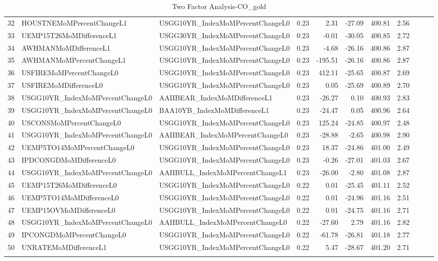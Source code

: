 \begin{longtable}{rllrrrrrlll}
  32 & HOUSTNEMoMPercentChangeL1 & USGG10YR\_IndexMoMPercentChangeL0 & 0.23 & 2.31 & -27.09 & 400.81 & 2.56 &  &  &  \\ 
  33 & UEMP15T26MoMDifferenceL1 & USGG30YR\_IndexMoMPercentChangeL0 & 0.23 & -0.01 & -30.05 & 400.85 & 2.72 &  &  &  \\ 
  34 & AWHMANMoMDifferenceL1 & USGG10YR\_IndexMoMPercentChangeL0 & 0.23 & -4.68 & -26.16 & 400.86 & 2.87 &  &  &  \\ 
  35 & AWHMANMoMPercentChangeL1 & USGG10YR\_IndexMoMPercentChangeL0 & 0.23 & -195.51 & -26.16 & 400.86 & 2.87 &  &  &  \\ 
  36 & USFIREMoMPercentChangeL0 & USGG10YR\_IndexMoMPercentChangeL0 & 0.23 & 412.11 & -25.65 & 400.87 & 2.69 &  &  &  \\ 
  37 & USFIREMoMDifferenceL0 & USGG10YR\_IndexMoMPercentChangeL0 & 0.23 & 0.05 & -25.69 & 400.89 & 2.70 &  &  &  \\ 
  38 & USGG10YR\_IndexMoMPercentChangeL0 & AAIIBEAR\_IndexMoMDifferenceL1 & 0.23 & -26.27 & 0.10 & 400.93 & 2.83 &  &  &  \\ 
  39 & USGG10YR\_IndexMoMPercentChangeL0 & BAA10YB\_IndexMoMDifferenceL1 & 0.23 & -24.47 & 0.05 & 400.96 & 2.64 &  &  &  \\ 
  40 & USCONSMoMPercentChangeL0 & USGG10YR\_IndexMoMPercentChangeL0 & 0.23 & 125.24 & -24.85 & 400.97 & 2.48 &  &  &  \\ 
  41 & USGG10YR\_IndexMoMPercentChangeL0 & AAIIBEAR\_IndexMoMPercentChangeL0 & 0.23 & -28.88 & -2.65 & 400.98 & 2.90 &  &  &  \\ 
  42 & UEMP5TO14MoMPercentChangeL0 & USGG10YR\_IndexMoMPercentChangeL0 & 0.23 & 18.37 & -24.86 & 401.00 & 2.49 &  &  &  \\ 
  43 & IPDCONGDMoMDifferenceL0 & USGG10YR\_IndexMoMPercentChangeL0 & 0.23 & -0.26 & -27.01 & 401.03 & 2.67 &  &  &  \\ 
  44 & USGG10YR\_IndexMoMPercentChangeL0 & AAIIBULL\_IndexMoMPercentChangeL1 & 0.23 & -26.00 & -2.80 & 401.08 & 2.87 &  &  &  \\ 
  45 & UEMP15T26MoMDifferenceL0 & USGG10YR\_IndexMoMPercentChangeL0 & 0.22 & 0.01 & -25.45 & 401.11 & 2.52 &  &  &  \\ 
  46 & UEMP5TO14MoMDifferenceL0 & USGG10YR\_IndexMoMPercentChangeL0 & 0.22 & 0.01 & -24.96 & 401.16 & 2.51 &  &  &  \\ 
  47 & UEMP15OVMoMDifferenceL0 & USGG10YR\_IndexMoMPercentChangeL0 & 0.22 & 0.01 & -24.75 & 401.16 & 2.71 &  &  &  \\ 
  48 & USGG10YR\_IndexMoMPercentChangeL0 & AAIIBULL\_IndexMoMPercentChangeL0 & 0.22 & -27.60 & 2.79 & 401.16 & 2.82 &  &  &  \\ 
  49 & IPCONGDMoMPercentChangeL0 & USGG10YR\_IndexMoMPercentChangeL0 & 0.22 & -61.78 & -26.81 & 401.18 & 2.77 &  &  &  \\ 
  50 & UNRATEMoMDifferenceL1 & USGG10YR\_IndexMoMPercentChangeL0 & 0.22 & 5.47 & -28.67 & 401.20 & 2.71 &  &  &  \\ 
   \hline
\hline
\caption{Two Factor Analysis-CO_gold} 
\end{longtable}
